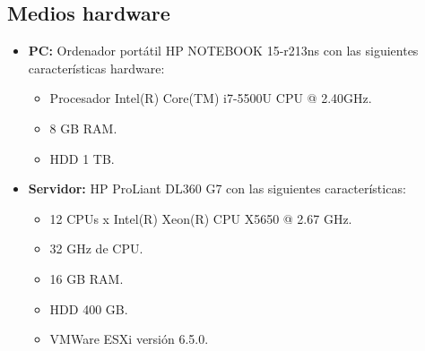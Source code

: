 \subsection{Medios hardware}

\begin{itemize}
\item \textbf{PC:} Ordenador portátil HP NOTEBOOK 15-r213ns con las siguientes características hardware:
\begin{itemize}
\item Procesador Intel(R) Core(TM) i7-5500U CPU @ 2.40GHz.
\item 8 GB RAM.
\item HDD 1 TB.
\end{itemize}

\item \textbf{Servidor:} HP ProLiant DL360 G7 con las siguientes características:
\begin{itemize}
\item 12 CPUs x Intel(R) Xeon(R) CPU X5650 @ 2.67 GHz.
\item 32 GHz de CPU.
\item 16 GB RAM.
\item HDD 400 GB.
\item VMWare ESXi versión 6.5.0.
\end{itemize}

\end{itemize}
